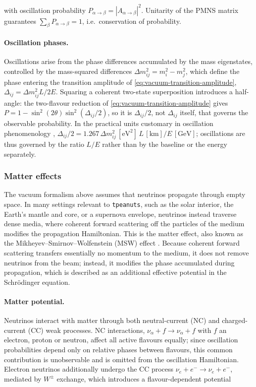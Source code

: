 with oscillation probability \(P_{\alpha\to\beta}=|A_{\alpha\to\beta}|^2\). Unitarity of the PMNS matrix guarantees \(\sum_\beta P_{\alpha\to\beta}=1\), i.e.\ conservation of probability.

\paragraph{Oscillation phases.}
Oscillations arise from the phase differences accumulated by the mass eigenstates, controlled by the mass-squared differences \(\Delta m_{ij}^2=m_i^2-m_j^2\), which define the phase entering the transition amplitude of \cref{eq:vacuum-transition-amplitude}, \(\Delta_{ij}=\Delta m_{ij}^2 L/2E\). Squaring a coherent two-state superposition introduces a half-angle: the two-flavour reduction of \cref{eq:vacuum-transition-amplitude} gives \(P=1-\sin^2(2\theta)\sin^2(\Delta_{ij}/2)\), so it is \(\Delta_{ij}/2\), not \(\Delta_{ij}\) itself, that governs the observable probability. In the practical units customary in oscillation phenomenology \parencite{PDG2022}, \(\Delta_{ij}/2=1.267\,\Delta m_{ij}^2\,[\mathrm{eV}^2]\,L\,[\mathrm{km}]/E\,[\mathrm{GeV}]\); oscillations are thus governed by the ratio \(L/E\) rather than by the baseline or the energy separately.

\subsubsection{Matter effects}

The vacuum formalism above assumes that neutrinos propagate through empty space. In many settings relevant to \texttt{tpeanuts}, such as the solar interior, the Earth's mantle and core, or a supernova envelope, neutrinos instead traverse dense media, where coherent forward scattering off the particles of the medium modifies the propagation Hamiltonian. This is the matter effect, also known as the Mikheyev--Smirnov--Wolfenstein (MSW) effect \parencite{Wolfenstein1978,MikheyevSmirnov1985,Giunti2007}. Because coherent forward scattering transfers essentially no momentum to the medium, it does not remove neutrinos from the beam; instead, it modifies the phase accumulated during propagation, which is described as an additional effective potential in the Schr\"odinger equation.

\paragraph{Matter potential.}
Neutrinos interact with matter through both neutral-current (NC) and charged-current (CC) weak processes. NC interactions, \(\nu_\alpha+f\to\nu_\alpha+f\) with \(f\) an electron, proton or neutron, affect all active flavours equally; since oscillation probabilities depend only on relative phases between flavours, this common contribution is unobservable and is omitted from the oscillation Hamiltonian. Electron neutrinos additionally undergo the CC process \(\nu_e+e^-\to\nu_e+e^-\), mediated by \(W^{\pm}\) exchange, which introduces a flavour-dependent potential

